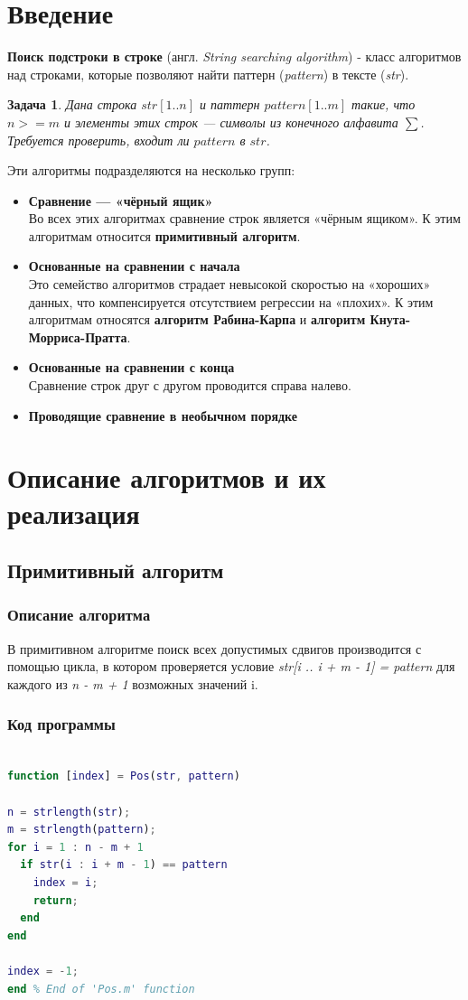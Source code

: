 \documentclass[12pt]{article}
\newtheorem{theorem}{Задача}
\begin{document}
\section{Введение}
\textbf{Поиск подстроки в строке} (англ. \textit{String searching algorithm}) -  класс алгоритмов над строками, которые позволяют найти паттерн (\textit{pattern}) в тексте (\textit{str}).
\begin{theorem} \label{task1}
	Дана строка $ str[1 .. n] $ и паттерн $ pattern[1 .. m] $ такие, что $ n >= m $ и элементы этих строк — символы из конечного алфавита $ \sum $. Требуется проверить, входит ли $ pattern $ в $ str $.
\end{theorem}
Эти алгоритмы подразделяются на несколько групп:
\begin{itemize}
	\item \textbf{Сравнение — «чёрный ящик»}\\
	Во всех этих алгоритмах сравнение строк является «чёрным ящиком». К этим алгоритмам относится \textbf{примитивный алгоритм}.
	\item \textbf{Основанные на сравнении с начала}\\
	Это семейство алгоритмов страдает невысокой скоростью на «хороших» данных, что компенсируется отсутствием регрессии на «плохих». К этим алгоритмам относятся \textbf{алгоритм Рабина-Карпа} и \textbf{алгоритм Кнута-Морриса-Пратта}.
	\item \textbf{Основанные на сравнении с конца}\\
	Сравнение строк друг с другом проводится справа налево.
	\item \textbf{Проводящие сравнение в необычном порядке}
\end{itemize}
\section{Описание алгоритмов и их реализация}
\subsection{Примитивный алгоритм}
\subsubsection{Описание алгоритма}
В примитивном алгоритме поиск всех допустимых сдвигов производится с помощью цикла, в котором проверяется условие \textit{str[i .. i + m - 1] = pattern} для каждого из \textit{n - m + 1} возможных значений i.
\subsubsection{Код программы}
\begin{lstlisting}[language={Matlab}, caption={Примитивный алгоритм поиска подстроки в строке}, label={Script}]

function [index] = Pos(str, pattern)

n = strlength(str);
m = strlength(pattern);
for i = 1 : n - m + 1
  if str(i : i + m - 1) == pattern
    index = i;
    return;
  end
end

index = -1;
end % End of 'Pos.m' function
\end{lstlisting}
\end{document}
